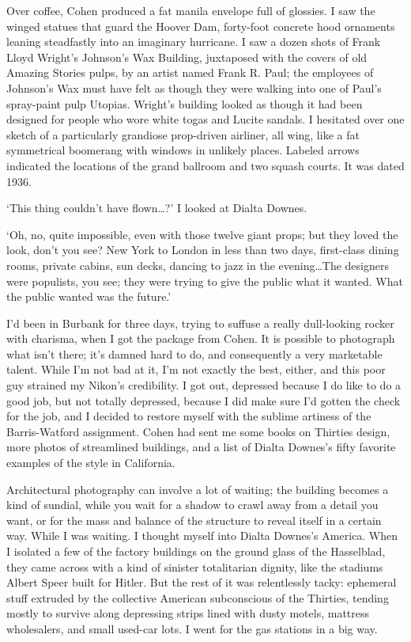 Over coffee, Cohen produced a fat manila envelope full of glossies. I saw the winged statues that guard the Hoover Dam, forty-foot concrete hood ornaments leaning steadfastly into an imaginary hurricane. I saw a dozen shots of Frank Lloyd Wright's Johnson's Wax Building, juxtaposed with the covers of old Amazing Stories pulps, by an artist named Frank R. Paul; the employees of Johnson's Wax must have felt as though they were walking into one of Paul's spray-paint pulp Utopias. Wright's building looked as though it had been designed for people who wore white togas and Lucite sandals. I hesitated over one sketch of a particularly grandiose prop-driven airliner, all wing, like a fat symmetrical boomerang with windows in unlikely places. Labeled arrows indicated the locations of the grand ballroom and two squash courts. It was dated 1936.

`This thing couldn't have flown…?' I looked at Dialta Downes.

`Oh, no, quite impossible, even with those twelve giant props; but they loved the look, don't you see? New York to London in less than two days, first-class dining rooms, private cabins, sun decks, dancing to jazz in the evening…The designers were populists, you see; they were trying to give the public what it wanted. What the public wanted was the future.'

I'd been in Burbank for three days, trying to suffuse a really dull-looking rocker with charisma, when I got the package from Cohen. It is possible to photograph what isn't there; it's damned hard to do, and consequently a very marketable talent. While I'm not bad at it, I'm not exactly the best, either, and this poor guy strained my Nikon's credibility. I got out, depressed because I do like to do a good job, but not totally depressed, because I did make sure I'd gotten the check for the job, and I decided to restore myself with the sublime artiness of the Barris-Watford assignment. Cohen had sent me some books on Thirties design, more photos of streamlined buildings, and a list of Dialta Downes's fifty favorite examples of the style in California.

Architectural photography can involve a lot of waiting; the building becomes a kind of sundial, while you wait for a shadow to crawl away from a detail you want, or for the mass and balance of the structure to reveal itself in a certain way. While I was waiting. I thought myself into Dialta Downes's America. When I isolated a few of the factory buildings on the ground glass of the Hasselblad, they came across with a kind of sinister totalitarian dignity, like the stadiums Albert Speer built for Hitler. But the rest of it was relentlessly tacky: ephemeral stuff extruded by the collective American subconscious of the Thirties, tending mostly to survive along depressing strips lined with dusty motels, mattress wholesalers, and small used-car lots. I went for the gas stations in a big way.

